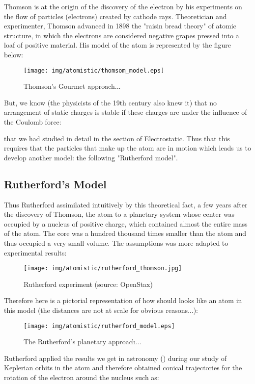 Thomson is at the origin of the discovery of the electron by his experiments on the flow of particles (electrons) created by cathode rays. Theoretician and experimenter, Thomson advanced in 1898 the "raisin bread theory" of atomic structure, in which the electrons are considered negative grapes pressed into a loaf of positive material. His model of the atom is represented by the figure below:

\begin{figure}[H]
\centering
\texttt{[image: img/atomistic/thomsom\_model.eps]}
\caption{Thomson's Gourmet approach...}
\end{figure}

But, we know (the physicists of the 19th century also knew it) that no arrangement of static charges is stable if these charges are under the influence of the Coulomb force:
	
that we had studied in detail in the section of Electrostatic. Thus that this requires that the particles that make up the atom are in motion which leads us to develop another model: the following "Rutherford model".

\subsection{Rutherford's Model}\label{rhuterford model}

Thus Rutherford assimilated intuitively by this theoretical fact, a few years after the discovery of Thomson, the atom to a planetary system whose center was occupied by a nucleus of positive charge, which contained almost the entire mass of the atom. The core was a hundred thousand times smaller than the atom and thus occupied a very small volume. The assumptions was more adapted to experimental results:
	\begin{figure}[H]
		\centering
		\texttt{[image: img/atomistic/rutherford\_thomson.jpg]}	
		\caption[Rutherford experiment]{Rutherford experiment (source: OpenStax)}
	\end{figure}
Therefore here is a pictorial representation of how should looks like an atom in this model (the distances are not at scale for obvious reasons...):

\begin{figure}[H]
\centering
\texttt{[image: img/atomistic/rutherford\_model.eps]}
\caption{The Rutherford's planetary approach...}
\end{figure}

Rutherford applied the results we get in astronomy () during our study of Keplerian orbits in the atom and therefore obtained conical trajectories for the rotation of the electron around the nucleus such as:
	
